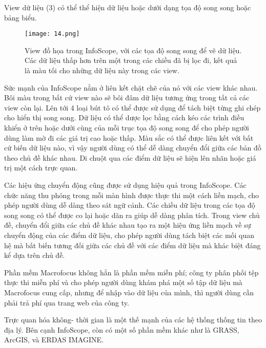 \documentclass[13pt]{scrartcl} %
\begin{document}
View dữ liệu (3) có thể thể hiện dữ liệu hoặc dưới dạng tọa độ song song hoặc bảng biểu.

\begin{figure}[!ht] %
    \centering
    \texttt{[image: 14.png]}
    \caption{View đồ họa trong InfoScope, với các tọa độ song song để vẽ dữ liệu. Các dữ liệu thấp hơn trên một trong các chiều đã bị lọc đi, kết quả là màu tối cho những dữ liệu này trong các view.}
\end{figure}


Sức mạnh của InfoScope nằm ở liên kết chặt chẽ của nó với các view khác nhau. Bôi màu trong bất cứ view nào sẽ bôi đâm dữ liệu tương ứng trong tất cả các view còn lại. Lên tới 4 loại bút tô có thể được sử dụng để tách biệt từng ghi chép cho hiển thị song song. Dữ liệu có thể dược lọc bằng cách kéo các trình điều khiển ở trên hoặc dưới cùng của mỗi trục tọa độ song song để cho phép người dùng làm mờ đi các giá trị cao hoặc thấp. Màu sắc có thể được liên kết với bất cứ biến dữ liệu nào, vì vậy người dùng có thể dễ dàng chuyển đổi giữa các bản đồ theo chủ đề khác nhau. Di chuột qua các điểm dữ liệu sẽ hiện lên nhãn hoặc giá trị một cách trực quan.

Các hiệu ứng chuyển động cũng được sử dụng hiệu quả trong InfoScope. Các chức năng thu phóng trong mỗi màn hình được thực thi một cách liền mạch, cho phép người dùng dễ dàng theo sát ngữ cảnh. Các chiều dữ liệu trong các tọa độ song song có thể được co lại hoặc dãn ra giúp dễ dàng phân tích. Trong view chủ đề, chuyển đổi giữa các chủ đề khác nhau tạo ra một hiệu ứng liền mạch về sự chuyển động của các điểm dữ liệu, cho phép người dùng tách biệt các mối quan hệ mà bất biến tương đối giữa các chủ đề với các điểm dữ liệu mà khác biệt đáng kể dựa trên chủ đề.

Phần mềm Macrofocus không hẳn là phần mềm miễn phí; công ty phân phối tệp thực thi miễn phí và cho phép người dùng khám phá một số tập dữ liệu mà Macrofocus cung cấp, nhưng để nhập vào dữ liệu của mình, thì người dùng cần phải trả phí qua trang web của công ty.

Trực quan hóa không- thời gian là một thế mạnh của các hệ thống thống tin theo địa lý. Bên cạnh InfoScope, còn có một số phần mềm khác như là GRASS, ArcGIS, và ERDAS IMAGINE.



\end{document}
